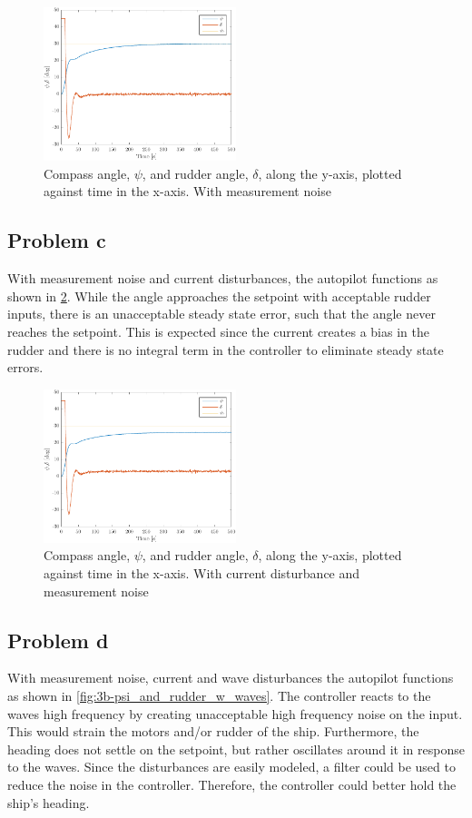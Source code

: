 \begin{figure}[ht]
    \centering
    \includegraphics[width=0.5\textwidth]{images/3b-psi_and_rudder}
    \caption{Compass angle, $\psi$, and rudder angle, $\delta$, along the y-axis, plotted against time in the x-axis. With measurement noise}
    \label{fig:3b-psi_and_rudder}
\end{figure}

\subsection{Problem c}
With measurement noise and current disturbances, the autopilot functions as shown in \cref{fig:3b-psi_and_rudder_w_current}. While the angle approaches the setpoint with acceptable rudder inputs, there is an unacceptable steady state error, such that the angle never reaches the setpoint. This is expected since the current creates a bias in the rudder and there is no integral term in the controller to eliminate steady state errors.

\begin{figure}[ht]
    \centering
    \includegraphics[width=0.5\textwidth]{images/3c-psi_and_rudder_w_current}
    \caption{Compass angle, $\psi$, and rudder angle, $\delta$, along the y-axis, plotted against time in the x-axis. With current disturbance and measurement noise}
    \label{fig:3b-psi_and_rudder_w_current}
\end{figure}

\subsection{Problem d}
With measurement noise, current and wave disturbances the autopilot functions as shown in \cref{fig:3b-psi_and_rudder_w_waves}. The controller reacts to the waves high frequency by creating unacceptable high frequency noise on the input. This would strain the motors and/or rudder of the ship. Furthermore, the heading does not settle on the setpoint, but rather oscillates around it in response to the waves. Since the disturbances are easily modeled, a filter could be used to reduce the noise in the controller. Therefore, the controller could better hold the ship's heading.

